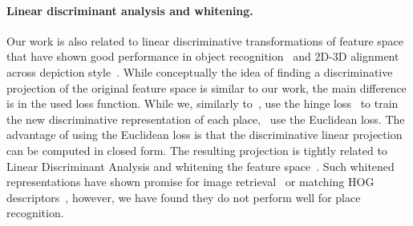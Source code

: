 \paragraph{Linear discriminant analysis and whitening.}
  \textcolor{petr}{
 Our work is also related to linear discriminative transformations of feature space that have shown good performance in object recognition~\cite{Gharbi12,Hariharan12} and 2D-3D alignment across depiction style~\cite{Aubry13}. While conceptually the idea of finding a discriminative projection of the original feature space is similar to our work, the main difference is in the used loss function. 
  While we, similarly to~\cite{Malisiewicz11,Shrivastava11}, use the hinge loss~\cite{scholkopf2002learning} to train the new discriminative representation of each place,~\cite{Aubry13,Gharbi12,Hariharan12} use the Euclidean loss. The advantage of using the Euclidean loss is that the discriminative linear projection can be computed in closed form. The resulting projection is tightly related to Linear Discriminant Analysis and whitening the feature space~\cite{Aubry13,Gharbi12,Hariharan12}. Such whitened representations have shown promise 
  for image retrieval~\cite{JegouChum12} or matching HOG~\cite{Dalal05} descriptors~\cite{Doersch13}, however, we have found they do not perform well for place recognition.
  }
    
 
  



